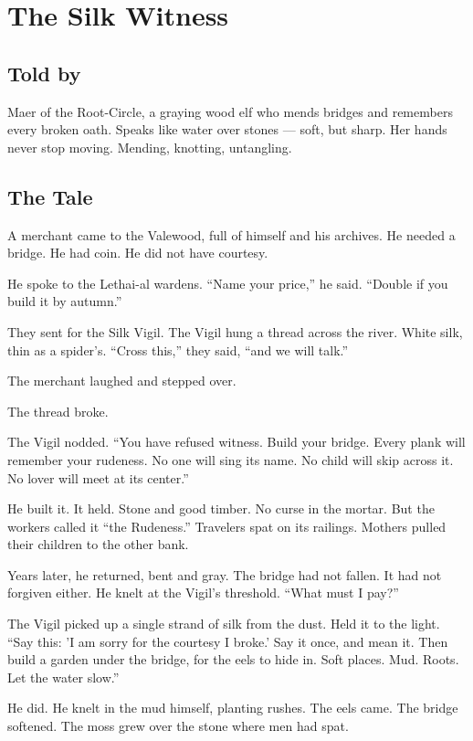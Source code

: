 \chapter{The Silk Witness}

\section*{Told by}

Maer of the Root-Circle, a graying wood elf who mends bridges and remembers every broken oath. Speaks like water over stones --- soft, but sharp. Her hands never stop moving. Mending, knotting, untangling.

\section*{The Tale}

A merchant came to the Valewood, full of himself and his archives. He needed a bridge. He had coin. He did not have courtesy.

He spoke to the Lethai-al wardens. ``Name your price,'' he said. ``Double if you build it by autumn.''

They sent for the Silk Vigil. The Vigil hung a thread across the river. White silk, thin as a spider's. ``Cross this,'' they said, ``and we will talk.''

The merchant laughed and stepped over.

The thread broke.

The Vigil nodded. ``You have refused witness. Build your bridge. Every plank will remember your rudeness. No one will sing its name. No child will skip across it. No lover will meet at its center.''

He built it. It held. Stone and good timber. No curse in the mortar. But the workers called it ``the Rudeness.'' Travelers spat on its railings. Mothers pulled their children to the other bank.

Years later, he returned, bent and gray. The bridge had not fallen. It had not forgiven either. He knelt at the Vigil's threshold. ``What must I pay?''

The Vigil picked up a single strand of silk from the dust. Held it to the light. ``Say this: 'I am sorry for the courtesy I broke.' Say it once, and mean it. Then build a garden under the bridge, for the eels to hide in. Soft places. Mud. Roots. Let the water slow.''

He did. He knelt in the mud himself, planting rushes. The eels came. The bridge softened. The moss grew over the stone where men had spat.


